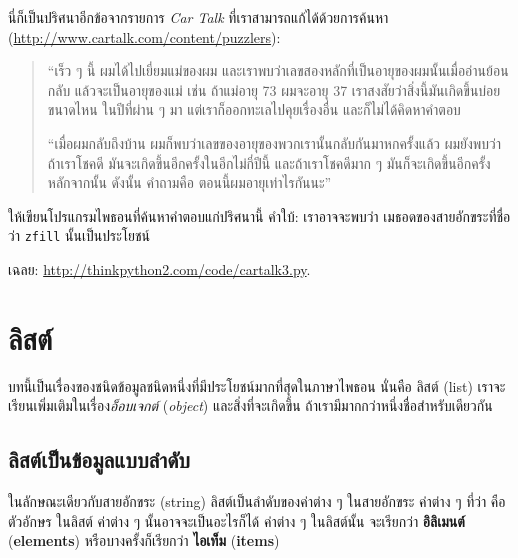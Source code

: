 \begin{exercise}
นี่ก็เป็นปริศนาอีกข้อจากรายการ {\em Car Talk} ที่เราสามารถแก้ได้ด้วยการค้นหา
(\url{http://www.cartalk.com/content/puzzlers}):

\begin{quote}
``เร็ว ๆ นี้ ผมได้ไปเยี่ยมแม่ของผม และเราพบว่าเลขสองหลักที่เป็นอายุของผมนั้นเมื่ออ่านย้อนกลับ
แล้วจะเป็นอายุของแม่ เช่น ถ้าแม่อายุ 73 ผมจะอายุ 37 เราสงสัยว่าสิ่งนี้มันเกิดขึ้นบ่อยขนาดไหน
ในปีที่ผ่าน ๆ มา แต่เราก็ออกทะเลไปคุยเรื่องอื่น และก็ไม่ได้คิดหาคำตอบ

``เมื่อผมกลับถึงบ้าน ผมก็พบว่าเลขของอายุของพวกเรานั้นกลับกันมาหกครั้งแล้ว ผมยังพบว่าถ้าเราโชคดี
มันจะเกิดขึ้นอีกครั้งในอีกไม่กี่ปีนี้ และถ้าเราโชคดีมาก ๆ มันก็จะเกิดขึ้นอีกครั้งหลักจากนั้น ดังนั้น
คำถามคือ ตอนนี้ผมอายุเท่าไรกันนะ''

\end{quote}

ให้เขียนโปรแกรมไพธอนที่ค้นหาคำตอบแก่ปริศนานี้ 
คำใบ้: เราอาจจะพบว่า เมธอดของสายอักขระที่ชื่อว่า {\tt zfill} นั้นเป็นประโยชน์

เฉลย: \url{http://thinkpython2.com/code/cartalk3.py}.

\end{exercise}



\chapter{ลิสต์}

บทนี้เป็นเรื่องของชนิดข้อมูลชนิดหนึ่งที่มีประโยชน์มากที่สุดในภาษาไพธอน
นั่นคือ ลิสต์ (list)
เราจะเรียนเพิ่มเติมในเรื่อง\textit{อ็อบเจกต์} (\textit{object})
และสิ่งที่จะเกิดขึ้น ถ้าเรามีมากกว่าหนึ่งชื่อสำหรับเดียวกัน


\section{ลิสต์เป็นข้อมูลแบบลำดับ}
\label{sequence}

ในลักษณะเดียวกับสายอักขระ (string)
ลิสต์เป็นลำดับของค่าต่าง ๆ
ในสายอักขระ ค่าต่าง ๆ ที่ว่า คือ ตัวอักษร
ในลิสต์ ค่าต่าง ๆ นั้นอาจจะเป็นอะไรก็ได้
ค่าต่าง ๆ ในลิสต์นั้น จะเรียกว่า \textbf{อิลิเมนต์} (\textbf{elements})
หรือบางครั้งก็เรียกว่า \textbf{ไอเท็ม} (\textbf{items})

